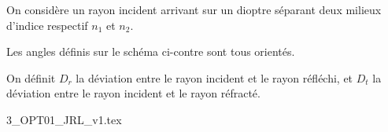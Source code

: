 	\finEntrainement
	




	
	
	
	\hauteurLargeurCadreReponse		{8mm}{5cm}
	\initialisationEntrainement
	
	
	\initialisationPartieGauche %
	On considère un rayon incident arrivant sur un dioptre séparant deux milieux d'indice respectif $n_1$ et $n_2$. 
	
	Les angles définis sur le schéma ci-contre sont tous orientés. 
	
	On définit $D_r$ la déviation entre le rayon incident et le rayon réfléchi, et $D_t$ la déviation entre le rayon incident et le rayon réfracté.
			
	\initialisationPartieDroite %
	\begin{center}
		{3_OPT01_JRL_v1.tex}
	\end{center}
	\finalisationDuPartageDePage %
	
